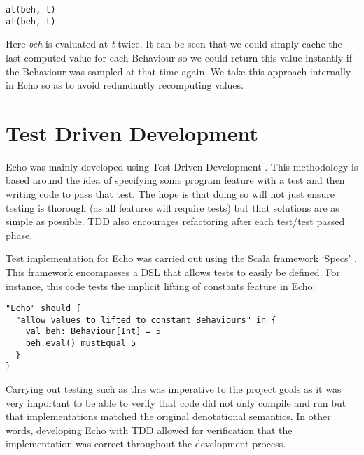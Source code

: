 \begin{verbatim}
at(beh, t)
at(beh, t)
\end{verbatim}  

    Here \emph{beh} is evaluated at \emph{t} twice. It can be seen that we could simply cache the last
    computed value for each Behaviour so we could return this value instantly if the Behaviour was sampled at that time 
    again.
    We take this approach internally in Echo so as to avoid redundantly recomputing values. 
  
  \section{Test Driven Development}
    Echo was mainly developed using Test Driven Development \cite{Cunningham}. This methodology is based around the idea
    of specifying some program feature with a test and then writing code to pass that test. The hope
    is that doing so will not just ensure testing is thorough (as all features will require tests) but
    that solutions are as simple as possible. TDD also encourages
    refactoring after each test/test passed phase.

    Test implementation for Echo was carried out using the Scala framework `Specs' \cite{EricTorreborre}. This framework
    encompasses a DSL that allows tests to easily be defined. For instance, this code tests the implicit lifting
    of constants feature in Echo:

\begin{verbatim}
"Echo" should {
  "allow values to lifted to constant Behaviours" in {
    val beh: Behaviour[Int] = 5
    beh.eval() mustEqual 5
  }
}
\end{verbatim}

    Carrying out testing such as this was imperative to the project goals as it was very important to be able
    to verify that code did not only compile and run but that implementations matched the original denotational 
    semantics. In other words, developing Echo with TDD allowed for verification that the implementation
    was correct throughout the development process.